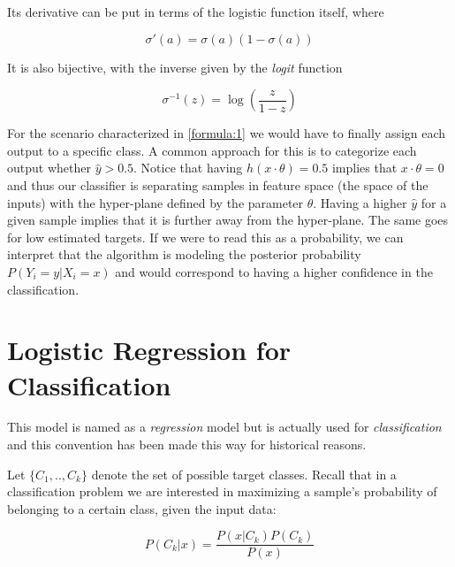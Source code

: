  Its derivative can be put in terms of the logistic function itself, where

\begin{equation}\label{eq:derivativeLogisticFunction}
\sigma '(a) = \sigma(a)( 1 - \sigma(a) )
\end{equation}

It is also bijective, with the inverse given by the \textit{logit} function

\begin{equation}\label{eq:logitFunction}
\sigma^{-1}(z) = \log( \frac{z}{1 - z})
\end{equation}

For the scenario characterized in \cref{formula:1} we would have to finally assign each output to a specific class. A common approach for this is to categorize each output whether $\hat{y} > 0.5$\label{formula:logitThreshold}. Notice that having $h(x \cdot \theta) = 0.5$ implies that $x \cdot \theta = 0$ and thus our classifier is separating samples in feature space (the space of the inputs) with the hyper-plane defined by the parameter $\theta$. Having a higher $\hat{y}$ for a given sample implies that it is further away from the hyper-plane. The same goes for low estimated targets. If we were to read this as a probability, we can interpret that the algorithm is modeling the posterior probability $P(Y_i = y | X_i = x)$ and would correspond to having a higher confidence in the classification.




\section{Logistic Regression for Classification}\label{section-logisticRegression}

This model is named as a \textit{regression} model but is actually used for \textit{classification} and this convention has been made this way for historical reasons.


Let $\{C_1,..,C_k\}$ denote the set of possible target classes. Recall that in a classification problem we are interested in maximizing a sample's probability of belonging to a certain class, given the input data:

\begin{equation}
P(C_k| x) = \frac{P(x|C_k)P(C_k)}{P(x)}
\end{equation}

